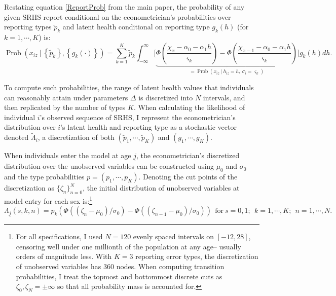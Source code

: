 \documentclass[12pt,pdftex,letterpaper]{article}
\newcommand{\Prob}{\operatorname{Prob}}
\newcommand{\Health}{h}
\newcommand{\Report}{x}
\newcommand{\Age}{j}
\newcommand{\Sex}{s}
\newcommand{\AgeMin}{\underline{\Age}}
\newcommand{\HealthInitMean}{\mu_0}
\newcommand{\HealthInitStd}{\sigma_0}
\newcommand{\Cut}{\chi}
\newcommand{\DiscreteCut}{\zeta}
\newcommand{\LatentParam}{\alpha}
\newcommand{\TypeProb}{p}
\newcommand{\TypeProbPcvd}{\widetilde{\TypeProb}}
\newcommand{\ReportStd}{\varsigma}
\newcommand{\HealthDstn}{\Lambda}
\newcommand{\HealthDstnPcvd}{\widetilde{\Lambda}}
\begin{document}
Restating equation \eqref{ReportProb} from the main paper, the probability of any given SRHS report conditional on the econometrician's probabilities over reporting types $\TypeProbPcvd_k$ and latent health conditional on reporting type $g_k(\Health)$ (for $k=1,\cdots,K$) is:
\begin{equation*}
\Prob \left( \Report_{iz} ~\big|~ \left\{\TypeProbPcvd_k \right\}, \left\{g_k(\cdot) \right\} \right) = \sum_{k=1}^K \TypeProbPcvd_k \int_{-\infty}^{\infty} \bigg[ \underbrace{\Phi \left(\frac{\Cut_{\Report} - \LatentParam_0 - \LatentParam_1 \Health}{\ReportStd_k} \right) - \Phi \left(\frac{\Cut_{\Report-1} - \LatentParam_0 - \LatentParam_1 \Health}{\ReportStd_k} \right)}_{= \Prob(\Report_{iz} ~|~ \Health_{iz} = \Health, ~ \sigma_i=\ReportStd_k)} \bigg]  g_k(\Health) d \Health.
\end{equation*}

To compute such probabilities, the range of latent health values that individuals can reasonably attain under parameters $\Delta$ is discretized into $N$ intervals, and then replicated by the number of types $K$.  When calculating the likelihood of individual $i$'s observed sequence of SRHS, I represent the econometrician's distribution over $i$'s latent health and reporting type as a stochastic vector denoted $\HealthDstnPcvd_i$, a discretization of both $(\TypeProbPcvd_1,\cdots,\TypeProbPcvd_K)$ and $(g_1,\cdots,g_K)$.

When individuals enter the model at age $\AgeMin$, the econometrician's discretized distribution over the unobserved variables can be constructed using $\HealthInitMean$ and $\HealthInitStd$ and the type probabilities $\TypeProb = (\TypeProb_1,\cdots,\TypeProb_K)$. Denoting the cut points of the discretization as $\{\DiscreteCut_n\}_{n=0}^N$, the initial distribution of unobserved variables at model entry for each sex is:\footnote{For all specifications, I used $N=120$ evenly spaced intervals on $[-12,28]$, censoring well under one millionth of the population at any age-- usually orders of magnitude less. With $K=3$ reporting error types, the discretization of unobserved variables has 360 nodes. When computing transition probabilities, I treat the topmost and bottommost discrete cuts as $\DiscreteCut_0,\DiscreteCut_N=\pm \infty$ so that all probability mass is accounted for.}
\begin{equation}
\HealthDstn_{\AgeMin}(\Sex,k,n) = \TypeProb_k \left(\Phi((\DiscreteCut_n - \HealthInitMean)/\HealthInitStd) - \Phi((\DiscreteCut_{n-1} - \HealthInitMean)/\HealthInitStd) \right) ~~\text{for}~ s=0,1; ~~ k=1,\cdots,K; ~~ n=1,\cdots,N.
\end{equation}
\end{document}
